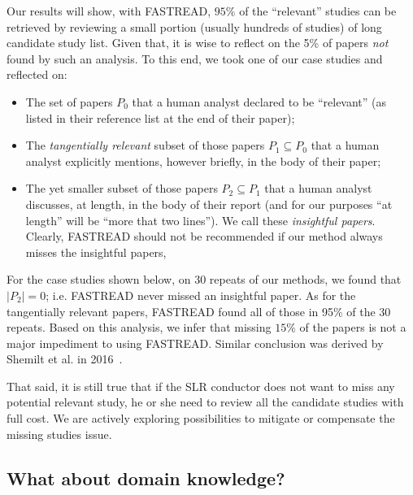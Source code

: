 \documentclass{svjour3}
\theoremstyle{break}
\begin{document}
Our results will show, with FASTREAD, $95\%$ of the ``relevant'' studies can be retrieved by reviewing a small portion (usually hundreds of studies) of long candidate study list. Given that, it is wise to reflect
on the 5\% of papers {\em not} found by such an analysis. To this end, we took one of our case studies and reflected on:
\begin{itemize}
\item The set of papers $P_0$ that a human analyst declared to be ``relevant'' (as listed in their reference list at the end of their paper);
\item The {\em tangentially relevant} subset of those  papers $P_1 \subseteq P_0$ that a human analyst explicitly mentions, however briefly, in the body of their paper;
\item The yet smaller subset of those papers $P_2 \subseteq P_1$  that a human analyst discusses, at length, in the body of their report (and for
our purposes ``at length'' will be ``more that two lines''). We call these {\em insightful papers}. Clearly, FASTREAD should not be recommended if our method always misses the insightful papers, 
\end{itemize}
For the case studies shown below, on 30 repeats of our methods, we found that $|P_2|=0$; i.e. FASTREAD never missed an insightful paper. As for the tangentially
relevant papers, FASTREAD found all of those in 95\% of the 30 repeats. 
Based on this analysis, we infer that missing  $15\%$ of the papers is not a major impediment to using FASTREAD. Similar conclusion was derived by Shemilt et al. in 2016~\cite{shemilt2016use}.

That said, it is still true that if the SLR conductor does not want to miss any potential relevant study, he or she need to review all the candidate studies with full cost. We are actively exploring possibilities to mitigate or compensate the missing studies issue. 


 

\subsection{What about domain knowledge?}
\end{document}
